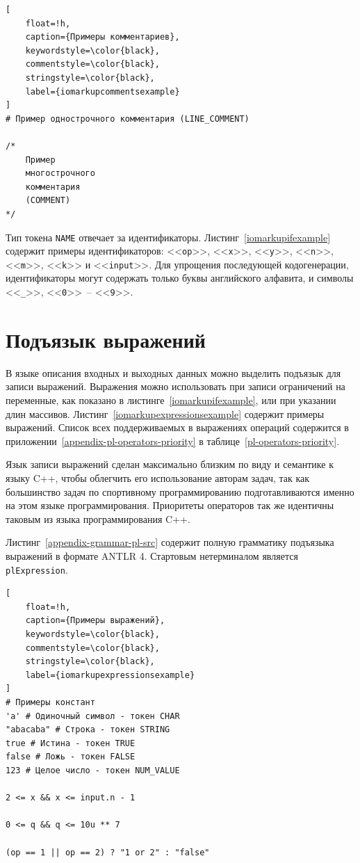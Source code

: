 \documentclass[times,specification,annotation]{style/itmo-student-thesis/itmo-student-thesis}
\begin{document}
\begin{lstlisting}[
    float=!h,
    caption={Примеры комментариев},
    keywordstyle=\color{black},
    commentstyle=\color{black},
    stringstyle=\color{black},
    label={iomarkupcommentsexample}
]
# Пример однострочного комментария (LINE_COMMENT)

/*
    Пример
    многострочного
    комментария
    (COMMENT)
*/
\end{lstlisting}

Тип токена \texttt{NAME} отвечает за идентификаторы. Листинг~\ref{iomarkupifexample} содержит примеры идентификаторов: <<\texttt{op}>>, <<\texttt{x}>>, <<\texttt{y}>>, <<\texttt{n}>>, <<\texttt{m}>>, <<\texttt{k}>> и <<\texttt{input}>>. Для упрощения последующей кодогенерации, идентификаторы могут содержать только буквы английского алфавита, и символы <<\texttt{\_}>>, <<\texttt{0}>>~-- <<\texttt{9}>>.

\section{Подъязык выражений}\label{syntax-pl-section}

В языке описания входных и выходных данных можно выделить подъязык для записи выражений. Выражения можно использовать при записи ограничений на переменные, как показано в листинге~\ref{iomarkupifexample}, или при указании длин массивов. Листинг~\ref{iomarkupexpressionsexample} содержит примеры выражений. Список всех поддерживаемых в выражениях операций содержится в приложении~\ref{appendix-pl-operators-priority} в таблице~\ref{pl-operators-priority}.

Язык записи выражений сделан максимально близким по виду и семантике к языку C++, чтобы облегчить его использование авторам задач, так как большинство задач по спортивному программированию подготавливаются именно на этом языке программирования. Приоритеты операторов так же идентичны таковым из языка программирования C++.

Листинг~\ref{appendix-grammar-pl-src} содержит полную грамматику подъязыка выражений в формате ANTLR 4. Стартовым нетерминалом является \texttt{plExpression}. 

\begin{lstlisting}[
    float=!h,
    caption={Примеры выражений},
    keywordstyle=\color{black},
    commentstyle=\color{black},
    stringstyle=\color{black},
    label={iomarkupexpressionsexample}
]
# Примеры констант
'a' # Одиночный символ - токен CHAR
"abacaba" # Строка - токен STRING
true # Истина - токен TRUE
false # Ложь - токен FALSE
123 # Целое число - токен NUM_VALUE

2 <= x && x <= input.n - 1

0 <= q && q <= 10u ** 7

(op == 1 || op == 2) ? "1 or 2" : "false"
\end{lstlisting}
\end{document}
